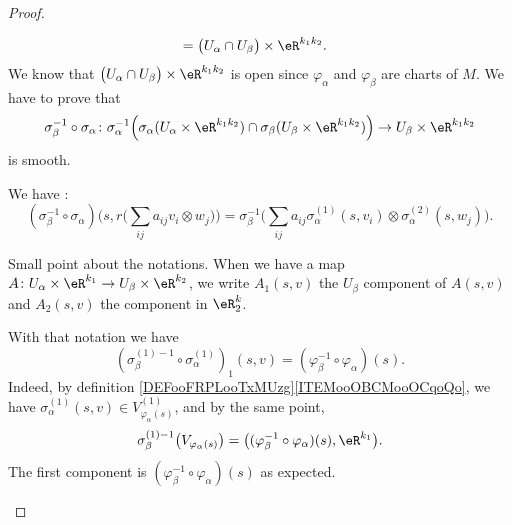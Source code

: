 \begin{proof}
\begin{subproof}
\begin{subproof}
\begin{subequations}
\begin{align}
					 & =\big( U_{\alpha}\cap U_{\beta}\big)\times \eR^{k_1k_2}.
				\end{align}
			\end{subequations}
			We know that \( \big( U_{\alpha}\cap U_{\beta}\big)\times \eR^{k_1k_2}\) is open since \( \varphi_{\alpha}\) and \( \varphi_{\beta}\) are charts of \( M\).
			We have to prove that
			\begin{equation}
				\sigma_{\beta}^{-1}\circ\sigma_{\alpha}  \colon  \sigma_{\alpha}^{-1}\Big( \sigma_{\alpha}(U_{\alpha}\times \eR^{k_1k_2})\cap \sigma_{\beta}(U_{\beta}\times \eR^{k_1k_2}) \Big)      \to  U_{\beta}\times \eR^{k_1k_2}
			\end{equation}
			is smooth.

			\begin{subproof}

				We have :
				\begin{equation}		\label{EQooNROCooARFfPa}
					(\sigma_{\beta}^{-1}\circ \sigma_{\alpha})\Big( s,r\big( \sum_{ij}a_{ij}v_i\otimes w_j \big)\Big)
					=\sigma_{\beta}^{-1}\Big( \sum_{ij}a_{ij}\sigma_{\alpha}^{(1)}(s,v_i)\otimes \sigma_{\alpha}^{(2)}(s,w_j) \Big).
				\end{equation}

				Small point about the notations. When we have a map \(A \colon U_{\alpha}\times \eR^{k_1}\to U_{\beta}\times \eR^{k_2}  \), we write \( A_1(s,v)\) the \( U_{\beta}\) component of \( A(s,v)\) and \( A_2(s,v)\) the component in \( \eR^k_2\).

				With that notation we have
				\begin{equation}		\label{EQooSBLDooRxPKQR}
					(\sigma_{\beta}^{(1)-1}\circ\sigma_{\alpha}^{(1)})_1(s,v)=(\varphi_{\beta}^{-1}\circ \varphi_{\alpha})(s).
				\end{equation}
				Indeed, by definition \ref{DEFooFRPLooTxMUzg}\ref{ITEMooOBCMooOCqoQo}, we have \( \sigma_{\alpha}^{(1)}(s,v)\in V_{\varphi_{\alpha}(s)}^{(1)}\), and by the same point,
				\begin{equation}
					\sigma_{\beta}^{(1)-1}\big( V_{\varphi_{\alpha}(s)} \big)=\big( (\varphi_{\beta}^{-1}\circ\varphi_{\alpha})(s), \eR^{k_1} \big).
				\end{equation}
				The first component is \( (\varphi_{\beta}^{-1}\circ \varphi_{\alpha})(s)\) as expected.


\end{subproof}
\end{subproof}
\end{subproof}
\end{proof}
